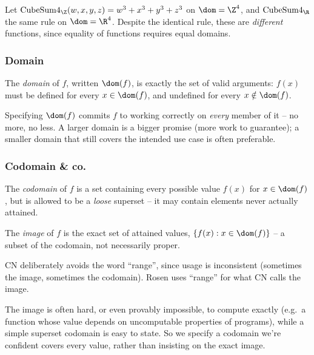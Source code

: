 \begin{example}
Let $\mathrm{CubeSum4}_\Z(w,x,y,z) = w^3+x^3+y^3+z^3$ on $\dom = \Z^4$, and $\mathrm{CubeSum4}_\R$ the same rule on $\dom = \R^4$. Despite the identical rule, these are \emph{different} functions, since equality of functions requires equal domains.
\end{example}

\subsubsection{Domain}
\label{sec:2-1-1}
\begin{definition}[Domain]
The \emph{domain} of $f$, written $\dom(f)$, is exactly the set of valid arguments: $f(x)$ must be defined for every $x \in \dom(f)$, and undefined for every $x \notin \dom(f)$.
\end{definition}

\begin{note}
Specifying $\dom(f)$ commits $f$ to working correctly on \emph{every} member of it -- no more, no less. A larger domain is a bigger promise (more work to guarantee); a smaller domain that still covers the intended use case is often preferable.
\end{note}

\subsubsection{Codomain \& co.}
\label{sec:2-1-2}
\begin{definition}[Codomain]
The \emph{codomain} of $f$ is a set containing every possible value $f(x)$ for $x \in \dom(f)$, but is allowed to be a \emph{loose} superset -- it may contain elements never actually attained.
\end{definition}

\begin{definition}[Image]
The \emph{image} of $f$ is the exact set of attained values, $\{f(x) : x \in \dom(f)\}$ -- a subset of the codomain, not necessarily proper.
\end{definition}

\begin{note}
CN deliberately avoids the word ``range'', since usage is inconsistent (sometimes the image, sometimes the codomain). Rosen uses ``range'' for what CN calls the image.
\end{note}

\begin{note}
The image is often hard, or even provably impossible, to compute exactly (e.g.\ a function whose value depends on uncomputable properties of programs), while a simple superset codomain is easy to state. So we specify a codomain we're confident covers every value, rather than insisting on the exact image.
\end{note}

